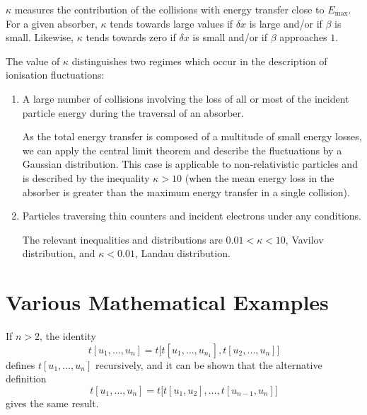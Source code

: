 $\kappa$ measures the contribution of the collisions with energy
transfer close to $E_{\mathrm{max}}$.  For a given absorber, $\kappa$
tends
towards large values if $\delta x$ is large and/or if $\beta$ is
small.  Likewise, $\kappa$ tends towards zero if $\delta x $ is small
and/or if $\beta$ approaches $1$.

The value of $\kappa$ distinguishes two regimes which occur in the
description of ionisation fluctuations:

\begin{enumerate}
\item A large number of collisions involving the loss of all or most
  of the incident particle energy during the traversal of an absorber.

  As the total energy transfer is composed of a multitude of small
  energy losses, we can apply the central limit theorem and describe
  the fluctuations by a Gaussian distribution.  This case is
  applicable to non-relativistic particles and is described by the
  inequality $\kappa > 10 $ (when the mean energy loss in the
  absorber is greater than the maximum energy transfer in a single
  collision).

\item Particles traversing thin counters and incident electrons under
  any conditions.

  The relevant inequalities and distributions are $ 0.01 < \kappa < 10
  $,
  Vavilov distribution, and $\kappa < 0.01 $, Landau distribution.
\end{enumerate}


\section{Various Mathematical Examples}
If $n > 2$, the identity
\[
  t[u_1,\dots,u_n] = t\bigl[t[u_1,\dots,u_{n_1}], t[u_2,\dots,u_n]
  \bigr]
\]
defines $t[u_1,\dots,u_n]$ recursively, and it can be shown that the
alternative definition
\[
  t[u_1,\dots,u_n] = t\bigl[t[u_1,u_2],\dots,t[u_{n-1},u_n]\bigr]
\]
gives the same result.



